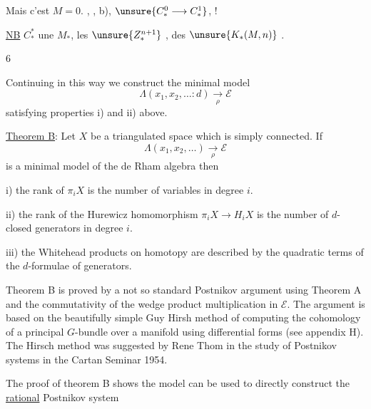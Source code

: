 
Mais c'est  $M=0$.
, ,  b),
   $\unsure{C_*^0\longrightarrow C_*^1}$,
 !

\uline{NB}  $C_*^*$ une  $M_*$,
les $\unsure{Z_*^{n+1}}$  ,
des $\unsure{K_*(M,n)}$ .

\begin{flushright}6\end{flushright}

Continuing in this way we construct the minimal model
\[
\Lambda(x_1,x_2,\ldots:d)\underset{\rho}{\longrightarrow}\mathcal E
\]
satisfying properties i) and ii) above.

\uline{Theorem B}: Let $X$ be a triangulated space which is simply connected. If
\[
\Lambda(x_1,x_2,\ldots)\underset{\rho}{\longrightarrow}\mathcal E
\]
is a minimal model of the de Rham algebra then

i) the rank of $\pi_i X$ is the number of variables in degree $i$.

ii) the rank of the Hurewicz homomorphism
$\pi_i X\longrightarrow H_i X$ is the number of $d$-closed generators in degree $i$.

iii) the Whitehead products on homotopy are described by the quadratic terms of the $d$-formulae of generators.

Theorem B is proved by a not so standard Postnikov argument using Theorem A and the commutativity of the wedge product multiplication in $\mathcal E$. The argument is based on the beautifully simple Guy Hirsh method of computing the cohomology of a principal $G$-bundle over a manifold using differential forms (see appendix H). The Hirsch method was suggested by Rene Thom in the study of Postnikov systems in the Cartan Seminar 1954.

The proof of theorem B shows the model can be used to directly construct the \uline{rational} Postnikov system

